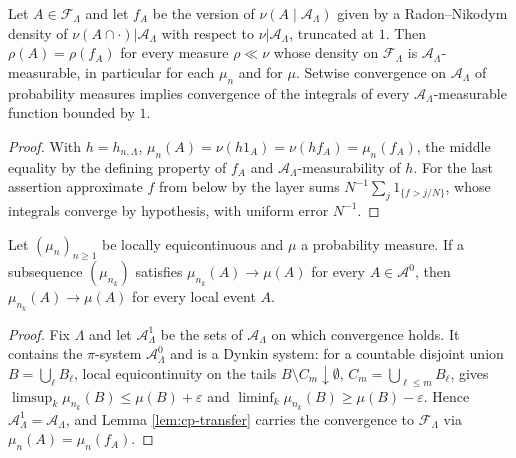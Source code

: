 \begin{lemma}
    \label{lem:cp-transfer}
    \leanok

    Let $A \in \mathcal{F}_\Lambda$ and let $f_A$ be the version of
    $\nu(A \mid \mathcal{A}_\Lambda)$ given by a Radon--Nikodym density of
    $\nu(A \cap \cdot)|\mathcal{A}_\Lambda$ with respect to $\nu|\mathcal{A}_\Lambda$, truncated
    at $1$. Then $\rho(A) = \rho(f_A)$ for every measure $\rho \ll \nu$ whose density on
    $\mathcal{F}_\Lambda$ is $\mathcal{A}_\Lambda$-measurable, in particular for each $\mu_n$
    and for $\mu$. Setwise convergence on $\mathcal{A}_\Lambda$ of probability measures
    implies convergence of the integrals of every $\mathcal{A}_\Lambda$-measurable function
    bounded by $1$.
\end{lemma}
\begin{proof}
    \leanok

    With $h = h_{n,\Lambda}$, $\mu_n(A) = \nu(h 1_A) = \nu(h f_A) = \mu_n(f_A)$, the middle
    equality by the defining property of $f_A$ and $\mathcal{A}_\Lambda$-measurability of $h$.
    For the last assertion approximate $f$ from below by the layer sums
    $N^{-1}\sum_{j} 1_{\{f > j/N\}}$, whose integrals converge by hypothesis, with uniform error
    $N^{-1}$.
\end{proof}

\begin{lemma}
    \label{lem:cp-dynkin}
    \leanok

    Let $(\mu_n)_{n\geq 1}$ be locally equicontinuous and $\mu$ a probability measure. If a
    subsequence $(\mu_{n_k})$ satisfies $\mu_{n_k}(A) \to \mu(A)$ for every $A \in \mathcal{A}^0$,
    then $\mu_{n_k}(A) \to \mu(A)$ for every local event $A$.
\end{lemma}
\begin{proof}
    \leanok

    Fix $\Lambda$ and let $\mathcal{A}^1_\Lambda$ be the sets of $\mathcal{A}_\Lambda$ on which
    convergence holds. It contains the $\pi$-system $\mathcal{A}^0_\Lambda$ and is a Dynkin
    system: for a countable disjoint union $B = \bigcup_\ell B_\ell$, local equicontinuity on
    the tails $B \setminus C_m \downarrow \emptyset$, $C_m = \bigcup_{\ell \leq m}B_\ell$, gives
    $\limsup_k \mu_{n_k}(B) \leq \mu(B)+\varepsilon$ and
    $\liminf_k \mu_{n_k}(B) \geq \mu(B)-\varepsilon$. Hence
    $\mathcal{A}^1_\Lambda = \mathcal{A}_\Lambda$, and Lemma \ref{lem:cp-transfer} carries the
    convergence to $\mathcal{F}_\Lambda$ via $\mu_n(A) = \mu_n(f_A)$.
\end{proof}

